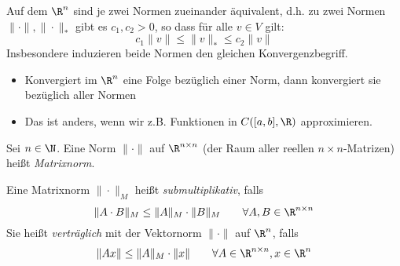 \documentclass{mycourse}
\begin{document}
\setcounter{thm}{8}
\begin{st}
\label{st:2.9}
Auf dem $\R^n$ sind je zwei Normen zueinander äquivalent, 
d.h. zu zwei Normen $\|\cdot\|, \|\cdot\|_*$ gibt es $c_1, c_2>0$, so dass für alle $v\in V$ gilt:
\[
c_1\|v\| \le \|v\|_* \le c_2\|v\|
\]
Insbesondere induzieren beide Normen den gleichen Konvergenzbegriff.
\begin{note}
\begin{itemize}
\item 
Konvergiert im $\R^n$ eine Folge bezüglich einer Norm, dann konvergiert sie bezüglich aller Normen
\item
Das ist anders, wenn wir z.B. Funktionen in $C([a,b],\R)$ approximieren.
\end{itemize}
\end{note}
\end{st}


\begin{df}
\label{df:2.10}
Sei $n\in \N$. 
Eine Norm $\|\cdot\|$ auf $\R^{n\times n}$ (der Raum aller reellen $n\times n$-Matrizen) heißt \emph{Matrixnorm}.

Eine Matrixnorm $\|\cdot\|_M$ heißt \emph{submultiplikativ}, falls
\[
\|A\cdot B\|_M\le \|A\|_M\cdot \|B\|_M \qquad \forall A,B\in \R^{n\times n}
\]
Sie heißt \emph{verträglich} mit der Vektornorm $\|\cdot\|$ auf $\R^n$, falls
\[
\|Ax\|\le \|A\|_M\cdot \|x\|  \qquad \forall A\in \R^{n\times n}, x\in \R^n
\]
\end{df}
\end{document}
